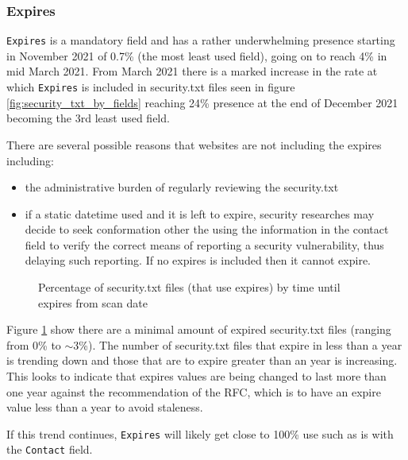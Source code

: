 \documentclass{mscreport}
\begin{document}
\subsubsection{Expires}

\noindent
\texttt{Expires} is a mandatory field and has a rather underwhelming presence starting in November 2021 of 0.7\% (the most least used field), going on to reach 4\% in mid March 2021. From March 2021 there is a marked increase in the rate at which \texttt{Expires} is included in security.txt files seen in figure \ref{fig:security_txt_by_fields} reaching 24\% presence at the end of December 2021 becoming the 3rd least used field.

\vspace{0.3cm} \noindent
There are several possible reasons that websites are not including the expires including:
\begin{itemize}
	\setlength\itemsep{0.01em}
    \item the administrative burden of regularly reviewing the security.txt
    \item if a static datetime used and it is left to expire, security researches may decide to seek conformation other the using the information in the contact field to verify the correct means of reporting a security vulnerability, thus delaying such reporting. If no expires is included then it cannot expire.
\end{itemize}

\begin{figure}[H]
	\begin{center}
		\caption{Percentage of security.txt files (that use expires) by time until expires from scan date}
		\label{fig:security_txt_by_when_expires}
	\end{center}
\end{figure}

\noindent
Figure \ref{fig:security_txt_by_when_expires} show there are a minimal amount of expired security.txt files (ranging from 0\% to $\sim$3\%). The number of security.txt files that expire in less than a year is trending down and those that are to expire greater than an year is increasing. This looks to indicate that expires values are being changed to last more than one year against the recommendation of the RFC, which is to have an expire value less than a year to avoid staleness.

\vspace{0.3cm} \noindent
If this trend continues, \texttt{Expires} will likely get close to 100\% use such as is with the \texttt{Contact} field.
\end{document}
